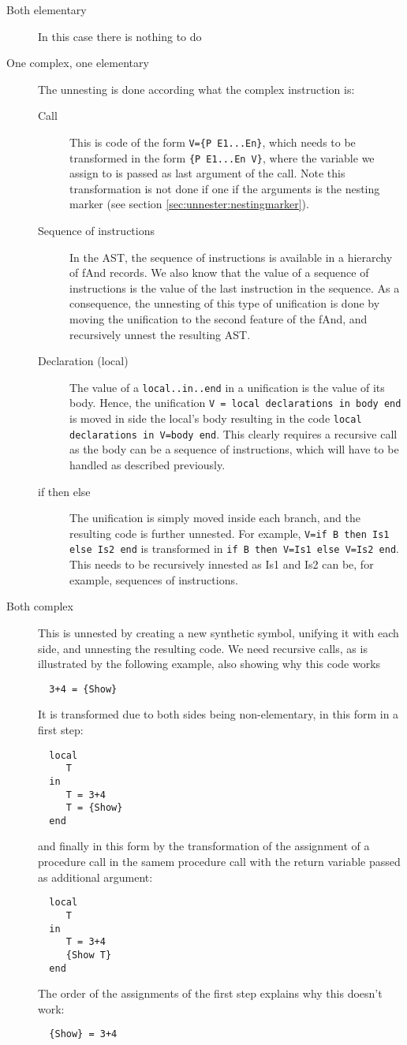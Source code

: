 \documentclass[a4paper]{memoir}
\begin{document}
\begin{description}
  \item[Both elementary]In this case there is nothing to do
  \item[One complex, one elementary] The unnesting is done according what the complex instruction is: 
    \begin{description}
      \item[Call] This is code of the form \lstinline!V={P E1...En}!, which needs to be transformed in the form \lstinline!{P E1...En V}!, where the variable we assign to is passed as last argument of the call. Note this transformation is not done if one if the arguments is the nesting marker (see section \ref{sec:unnester:nestingmarker}).
      \item[Sequence of instructions] In the AST, the sequence of instructions is available in a hierarchy of fAnd records. We also know that the value of a sequence of instructions is the value of the last instruction in the sequence. As a consequence, the unnesting of this type of unification is done by moving the unification to the second feature of the fAnd, and recursively unnest the resulting AST.
      \item[Declaration (local)] The value of a \lstinline!local..in..end! in a unification is the value of its body. Hence, the unification \lstinline!V = local declarations in body end! is moved in side the local's body resulting in the code \lstinline!local declarations in V=body end!. This clearly requires a recursive call as the body can be a sequence of instructions, which will have to be handled as described previously.
      \item[if then else] The unification is simply moved inside each branch, and the resulting code is further unnested. For example, \lstinline!V=if B then Is1 else Is2 end! is transformed in \lstinline!if B then V=Is1 else V=Is2 end!. This needs to be recursively innested as Is1 and Is2 can be, for example,  sequences of instructions.
    \end{description}
  \item[Both complex] This is unnested by creating a new synthetic symbol, unifying it with each side, and unnesting the resulting code.
We need recursive calls, as is illustrated by the following example, also showing why this code works
\begin{lstlisting}
  3+4 = {Show}
\end{lstlisting}
It is transformed due to both sides being non-elementary, in this form in a first step:
\begin{lstlisting}
  local
     T
  in
     T = 3+4
     T = {Show}
  end
\end{lstlisting}
and finally in this form by the transformation of the assignment of a procedure call in the samem procedure call with the return variable passed as additional argument:
\begin{lstlisting}
  local
     T
  in
     T = 3+4
     {Show T}
  end
\end{lstlisting}
The order of the assignments of the first step explains why this doesn't work:
\begin{lstlisting}
  {Show} = 3+4
\end{lstlisting}


\end{description}
\end{document}
